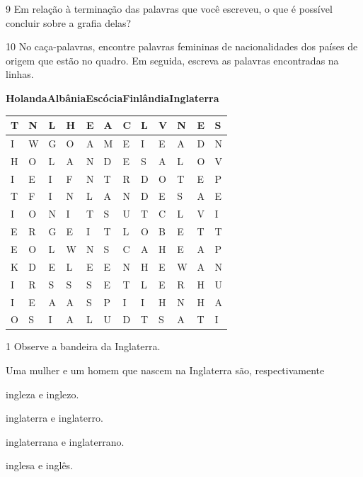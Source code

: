 \num{9} Em relação à terminação das palavras que você escreveu, o que é possível
concluir sobre a grafia delas?


\num{10} No caça-palavras, encontre palavras femininas de nacionalidades dos
países de origem que estão no quadro. Em seguida, escreva as palavras
encontradas na linhas.

\begin{mdframed}[linewidth=2pt,linecolor=salmao,roundcorner=20pt]
\textbf{Holanda}\hfill \textbf{Albânia}\hfill \textbf{Escócia}\hfill \textbf{Finlândia}\hfill \textbf{Inglaterra}
\end{mdframed}

\begin{longtable}[]{@{}llllllllllll@{}}
\toprule
T & N & L & H & E & A & C & L & V & N & E & S\tabularnewline
\midrule
\endhead
I & W & G & O & A & M & E & I & E & A & D & N\tabularnewline
H & O & L & A & N & D & E & S & A & L & O & V\tabularnewline
I & E & I & F & N & T & R & D & O & T & E & P\tabularnewline
T & F & I & N & L & A & N & D & E & S & A & E\tabularnewline
I & O & N & I & T & S & U & T & C & L & V & I\tabularnewline
E & R & G & E & I & T & L & O & B & E & T & T\tabularnewline
E & O & L & W & N & S & C & A & H & E & A & P\tabularnewline
K & D & E & L & E & E & N & H & E & W & A & N\tabularnewline
I & R & S & S & S & E & T & L & E & R & H & U\tabularnewline
I & E & A & A & S & P & I & I & H & N & H & A\tabularnewline
O & S & I & A & L & U & D & T & S & A & T & I\tabularnewline
\bottomrule
\end{longtable}



\num{1} Observe a bandeira da Inglaterra. %



Uma mulher e um homem que nascem na Inglaterra são, respectivamente

\begin{escolha}
\item ingleza e inglezo.

\item inglaterra e inglaterro.

\item inglaterrana e inglaterrano.

\item inglesa e inglês.
\end{escolha}

